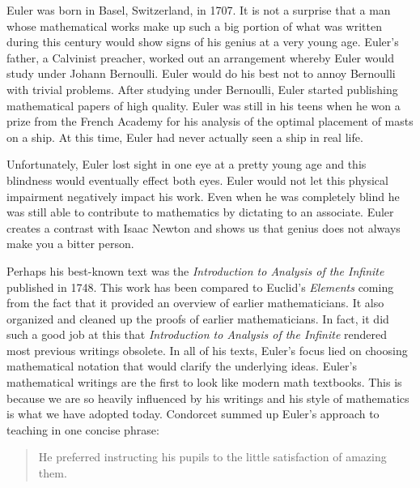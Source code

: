 \documentclass[12pt]{article}
\begin{document}
\begin{doublespace}
%
Euler was born in Basel, Switzerland, in 1707. It is not a surprise that a man whose mathematical works make up such a big portion of what was written during this century would show signs of his genius at a very young age. Euler's father, a Calvinist preacher, worked out an arrangement whereby Euler would study under Johann Bernoulli. Euler would do his best not to annoy Bernoulli with trivial problems. After studying under Bernoulli, Euler started publishing mathematical papers of high quality. Euler was still in his teens when he won a prize from the French Academy for his analysis of the optimal placement of masts on a ship. At this time, Euler had never actually seen a ship in real life.

Unfortunately, Euler lost sight in one eye at a pretty young age and this blindness would eventually effect both eyes. Euler would not let this physical impairment negatively impact his work. Even when he was completely blind he was still able to contribute to mathematics by dictating to an associate. Euler creates a contrast with Isaac Newton and shows us that genius does not always make you a bitter person. 

Perhaps his best-known text was the \emph{Introduction to Analysis of the Infinite} published in 1748. This work has been compared to Euclid's \emph{Elements} coming from the fact that it provided an overview of earlier mathematicians. It also organized and cleaned up the proofs of earlier mathematicians. In fact, it did such a good job at this that \emph{Introduction to Analysis of the Infinite} rendered most previous writings obsolete.
%
In all of his texts, Euler's focus lied on choosing mathematical notation that would clarify the underlying ideas. Euler's mathematical writings are the first to look like modern math textbooks. This is because we are so heavily influenced by his writings and his style of mathematics is what we have adopted today.
%
Condorcet summed up Euler's approach to teaching in one concise phrase:
%
\end{doublespace}
\vspace{-5mm}
\begin{quote}
He preferred instructing his pupils to the little satisfaction of    
amazing them.
\end{quote}
\vspace{-5mm}
\end{document}
